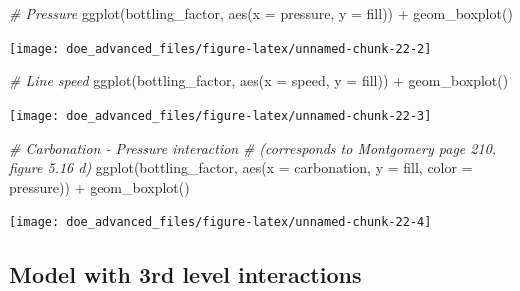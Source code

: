 \documentclass[
]{book}
\newenvironment{Shaded}{\begin{snugshade}}{\end{snugshade}}
\newcommand{\AttributeTok}[1]{\textcolor[rgb]{0.77,0.63,0.00}{#1}}
\newcommand{\CommentTok}[1]{\textcolor[rgb]{0.56,0.35,0.01}{\textit{#1}}}
\newcommand{\FunctionTok}[1]{\textcolor[rgb]{0.00,0.00,0.00}{#1}}
\newcommand{\NormalTok}[1]{#1}
\newcommand{\SpecialCharTok}[1]{\textcolor[rgb]{0.00,0.00,0.00}{#1}}
\begin{document}
\begin{Shaded}
\begin{Highlighting}[]
\CommentTok{\# Pressure}
\FunctionTok{ggplot}\NormalTok{(bottling\_factor, }\FunctionTok{aes}\NormalTok{(}\AttributeTok{x =}\NormalTok{ pressure, }\AttributeTok{y =}\NormalTok{ fill)) }\SpecialCharTok{+}
  \FunctionTok{geom\_boxplot}\NormalTok{()}
\end{Highlighting}
\end{Shaded}

\texttt{[image: doe\_advanced\_files/figure-latex/unnamed-chunk-22-2]}

\begin{Shaded}
\begin{Highlighting}[]
\CommentTok{\# Line speed}
\FunctionTok{ggplot}\NormalTok{(bottling\_factor, }\FunctionTok{aes}\NormalTok{(}\AttributeTok{x =}\NormalTok{ speed, }\AttributeTok{y =}\NormalTok{ fill)) }\SpecialCharTok{+}
  \FunctionTok{geom\_boxplot}\NormalTok{()}
\end{Highlighting}
\end{Shaded}

\texttt{[image: doe\_advanced\_files/figure-latex/unnamed-chunk-22-3]}

\begin{Shaded}
\begin{Highlighting}[]
\CommentTok{\# Carbonation {-} Pressure interaction}
\CommentTok{\# (corresponds to Montgomery page 210, figure 5.16 d)}
\FunctionTok{ggplot}\NormalTok{(bottling\_factor, }\FunctionTok{aes}\NormalTok{(}\AttributeTok{x =}\NormalTok{ carbonation, }\AttributeTok{y =}\NormalTok{ fill, }\AttributeTok{color =}\NormalTok{ pressure)) }\SpecialCharTok{+}
  \FunctionTok{geom\_boxplot}\NormalTok{()}
\end{Highlighting}
\end{Shaded}

\texttt{[image: doe\_advanced\_files/figure-latex/unnamed-chunk-22-4]}

\hypertarget{model-with-3rd-level-interactions}{%
\subsection{Model with 3rd level interactions}\label{model-with-3rd-level-interactions}}
\end{document}
